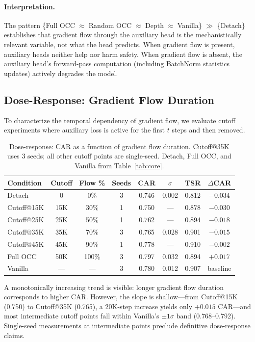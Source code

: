 \documentclass[10pt,letterpaper]{article}
\begin{document}
\paragraph{Interpretation.}
The pattern \{Full OCC $\approx$ Random OCC $\approx$ Depth $\approx$ Vanilla\} $\gg$ \{Detach\} establishes that gradient flow through the auxiliary head is the mechanistically relevant variable, not what the head predicts. When gradient flow is present, auxiliary heads neither help nor harm safety. When gradient flow is absent, the auxiliary head's forward-pass computation (including BatchNorm statistics updates) actively degrades the model.

\subsection{Dose-Response: Gradient Flow Duration}
\label{sec:dose}

To characterize the temporal dependency of gradient flow, we evaluate cutoff experiments where auxiliary loss is active for the first $t$ steps and then removed.

\begin{table}[t]
\centering
\caption{Dose-response: CAR as a function of gradient flow duration. Cutoff@35K uses 3 seeds; all other cutoff points are single-seed. Detach, Full OCC, and Vanilla from Table~\ref{tab:core}.}
\label{tab:dose}
\begin{tabular}{lccccccc}
\toprule
Condition & Cutoff & Flow \% & Seeds & CAR & $\sigma$ & TSR & $\Delta$CAR \\
\midrule
Detach        & 0     & 0\%   & 3 & 0.746 & 0.002 & 0.812 & $-0.034$ \\
Cutoff@15K    & 15K   & 30\%  & 1 & 0.750 & ---   & 0.878 & $-0.030$ \\
Cutoff@25K    & 25K   & 50\%  & 1 & 0.762 & ---   & 0.894 & $-0.018$ \\
Cutoff@35K    & 35K   & 70\%  & 3 & 0.765 & 0.028 & 0.901 & $-0.015$ \\
Cutoff@45K    & 45K   & 90\%  & 1 & 0.778 & ---   & 0.910 & $-0.002$ \\
Full OCC      & 50K   & 100\% & 3 & 0.797 & 0.032 & 0.894 & $+0.017$ \\
Vanilla       & ---   & ---   & 3 & 0.780 & 0.012 & 0.907 & baseline \\
\bottomrule
\end{tabular}
\end{table}

A monotonically increasing trend is visible: longer gradient flow duration corresponds to higher CAR. However, the slope is shallow---from Cutoff@15K (0.750) to Cutoff@35K (0.765), a 20K-step increase yields only $+0.015$ CAR---and most intermediate cutoff points fall within Vanilla's $\pm 1\sigma$ band (0.768--0.792). Single-seed measurements at intermediate points preclude definitive dose-response claims.
\end{document}
